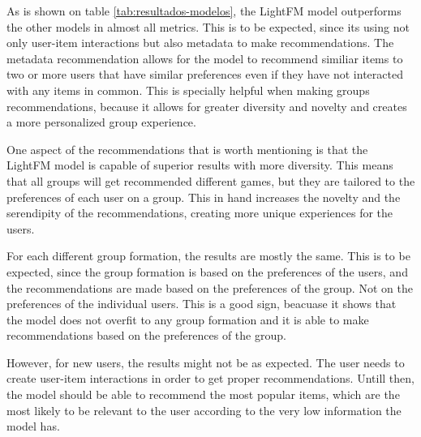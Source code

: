 \documentclass{article}
\begin{document}
As is shown on table \ref{tab:resultados-modelos}, the LightFM model outperforms the other models in almost all metrics. This is to be expected, since its using not only user-item interactions but also metadata to make recommendations. 
The metadata recommendation allows for the model to recommend similiar items to two or more users that have similar preferences even if they have not interacted with any items in common. This is specially helpful when 
making groups recommendations, because it allows for greater diversity and novelty and creates a more personalized group experience.

One aspect of the recommendations that is worth mentioning is that the LightFM model is capable of superior results with more diversity. This means that all groups will get recommended different games, but they are tailored to the preferences of each user on a group. This in hand increases the novelty and the serendipity of the recommendations, creating more unique experiences for the users.

For each different group formation, the results are mostly the same. This is to be expected, since the group formation is based on the preferences of the users, and the recommendations are made based on the preferences of the group. Not on the preferences of the individual users. This is a good sign, beacuase it shows that the model does not overfit to any group formation and it is able to make recommendations based on the preferences of the group.

However, for new users, the results might not be as expected. The user needs to create user-item interactions in order to get proper recommendations. Untill then, the model should be able to recommend the most popular items, which are the most likely to be relevant to the user according to the very low information the model has.
\end{document}
